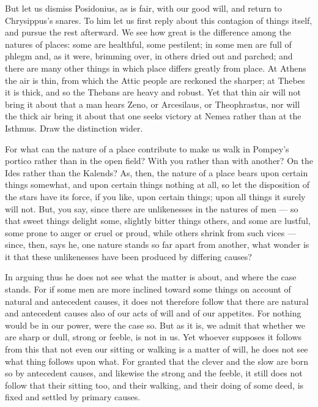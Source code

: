  But let us dismiss Posidonius, as is fair, with our good will, and return to Chrysippus's snares. To him let us first reply about this contagion of things itself, and pursue the rest afterward. We see how great is the difference among the natures of places: some are healthful, some pestilent; in some men are full of phlegm and, as it were, brimming over, in others dried out and parched; and there are many other things in which place differs greatly from place. At Athens the air is thin, from which the Attic people are reckoned the sharper; at Thebes it is thick, and so the Thebans are heavy and robust. Yet that thin air will not bring it about that a man hears Zeno, or Arcesilaus, or Theophrastus, nor will the thick air bring it about that one seeks victory at Nemea rather than at the Isthmus. Draw the distinction wider.

 For what can the nature of a place contribute to make us walk in Pompey's portico rather than in the open field? With you rather than with another? On the Ides rather than the Kalends? As, then, the nature of a place bears upon certain things somewhat, and upon certain things nothing at all, so let the disposition of the stars have its force, if you like, upon certain things; upon all things it surely will not. But, you say, since there are unlikenesses in the natures of men — so that sweet things delight some, slightly bitter things others, and some are lustful, some prone to anger or cruel or proud, while others shrink from such vices — since, then, says he, one nature stands so far apart from another, what wonder is it that these unlikenesses have been produced by differing causes?

 In arguing thus he does not see what the matter is about, and where the case stands. For if some men are more inclined toward some things on account of natural and antecedent causes, it does not therefore follow that there are natural and antecedent causes also of our acts of will and of our appetites. For nothing would be in our power, were the case so. But as it is, we admit that whether we are sharp or dull, strong or feeble, is not in us. Yet whoever supposes it follows from this that not even our sitting or walking is a matter of will, he does not see what thing follows upon what. For granted that the clever and the slow are born so by antecedent causes, and likewise the strong and the feeble, it still does not follow that their sitting too, and their walking, and their doing of some deed, is fixed and settled by primary causes.


